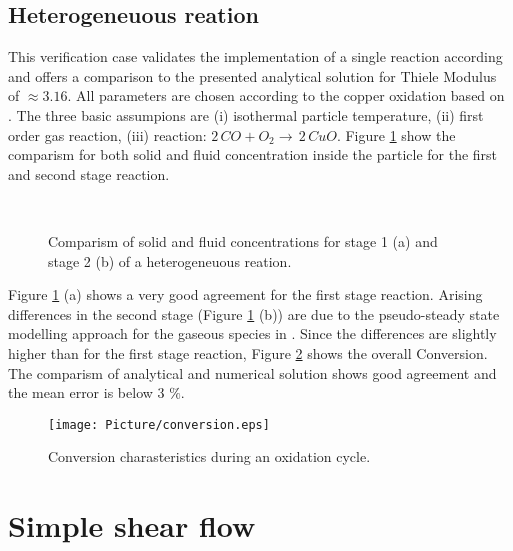\documentclass{particles2015}
\begin{document}
\subsection{Heterogeneuous reation}
\label{sec:heterogeneuous_reaction}

This verification case validates the implementation of a single reaction according \cite{Wen} and offers a comparison to the presented analytical solution for Thiele Modulus of $\approx 3.16$. All parameters are chosen according to the copper oxidation based on \cite{Noorman2011}. The three basic assumpions are (i) isothermal particle temperature, (ii) first order gas reaction, (iii) reaction: $2 \, CO + O_2 \rightarrow \, 2\, CuO$. Figure \ref{fig:reaction_stages} show the comparism for both solid and fluid concentration inside the particle for the first and second stage reaction.

\begin{figure}[h!]
\centering
{}
\hspace{0.3cm}
\\
\caption{Comparism of solid and fluid concentrations for stage 1 (a) and stage 2 (b) of a heterogeneuous reation.}
\label{fig:reaction_stages}
\end{figure}

Figure \ref{fig:reaction_stages} (a) shows a very good agreement for the first stage reaction. Arising differences in the second stage (Figure \ref{fig:reaction_stages} (b)) are due to the pseudo-steady state modelling approach for the gaseous species in \cite{Noorman2011}. Since the differences are slightly higher than for the first stage reaction, Figure \ref{fig:Conversion} shows the overall Conversion. The comparism of analytical and numerical solution shows good agreement and the mean error is below 3 $\%$. 

\begin{figure}[h!]
   \centering
   \texttt{[image: Picture/conversion.eps]}
   \caption{Conversion charasteristics during an oxidation cycle.}
   \label{fig:Conversion}
\end{figure}


\newpage
\section{Simple shear flow}
\label{sec:simple_shear}
\end{document}

